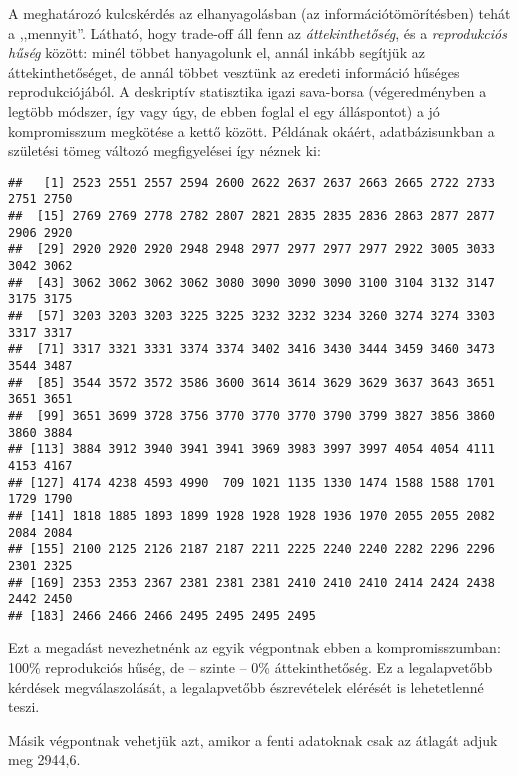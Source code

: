 \documentclass[]{book}
\newenvironment{Shaded}{\begin{snugshade}}{\end{snugshade}}
\newcommand{\OperatorTok}[1]{\textcolor[rgb]{0.81,0.36,0.00}{\textbf{#1}}}
\newcommand{\NormalTok}[1]{#1}
\begin{document}
A meghatározó kulcskérdés az elhanyagolásban (az információtömörítésben)
tehát a ,,mennyit''. Látható, hogy trade-off áll fenn az
\emph{áttekinthetőség}, és a \emph{reprodukciós hűség} között: minél
többet hanyagolunk el, annál inkább segítjük az áttekinthetőséget, de
annál többet vesztünk az eredeti információ hűséges reprodukciójából. A
deskriptív statisztika igazi sava-borsa (végeredményben a legtöbb
módszer, így vagy úgy, de ebben foglal el egy álláspontot) a jó
kompromisszum megkötése a kettő között. Példának okáért, adatbázisunkban
a születési tömeg változó megfigyelései így néznek ki:

\begin{Shaded}
\end{Shaded}

\begin{verbatim}
##   [1] 2523 2551 2557 2594 2600 2622 2637 2637 2663 2665 2722 2733 2751 2750
##  [15] 2769 2769 2778 2782 2807 2821 2835 2835 2836 2863 2877 2877 2906 2920
##  [29] 2920 2920 2920 2948 2948 2977 2977 2977 2977 2922 3005 3033 3042 3062
##  [43] 3062 3062 3062 3062 3080 3090 3090 3090 3100 3104 3132 3147 3175 3175
##  [57] 3203 3203 3203 3225 3225 3232 3232 3234 3260 3274 3274 3303 3317 3317
##  [71] 3317 3321 3331 3374 3374 3402 3416 3430 3444 3459 3460 3473 3544 3487
##  [85] 3544 3572 3572 3586 3600 3614 3614 3629 3629 3637 3643 3651 3651 3651
##  [99] 3651 3699 3728 3756 3770 3770 3770 3790 3799 3827 3856 3860 3860 3884
## [113] 3884 3912 3940 3941 3941 3969 3983 3997 3997 4054 4054 4111 4153 4167
## [127] 4174 4238 4593 4990  709 1021 1135 1330 1474 1588 1588 1701 1729 1790
## [141] 1818 1885 1893 1899 1928 1928 1928 1936 1970 2055 2055 2082 2084 2084
## [155] 2100 2125 2126 2187 2187 2211 2225 2240 2240 2282 2296 2296 2301 2325
## [169] 2353 2353 2367 2381 2381 2381 2410 2410 2410 2414 2424 2438 2442 2450
## [183] 2466 2466 2466 2495 2495 2495 2495
\end{verbatim}

Ezt a megadást nevezhetnénk az egyik végpontnak ebben a
kompromisszumban: 100\% reprodukciós hűség, de -- szinte -- 0\%
áttekinthetőség. Ez a legalapvetőbb kérdések megválaszolását, a
legalapvetőbb észrevételek elérését is lehetetlenné teszi.

Másik végpontnak vehetjük azt, amikor a fenti adatoknak csak az átlagát
adjuk meg 2944,6.
\end{document}
